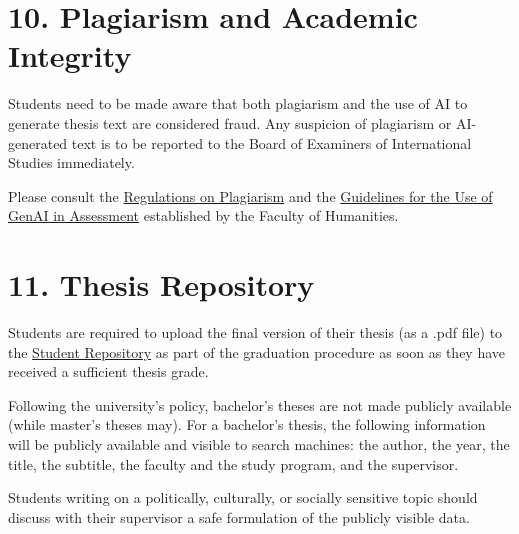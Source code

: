 \documentclass[11pt,a4paper]{article}
\begin{document}
\section{10. Plagiarism and Academic Integrity}

Students need to be made aware that both plagiarism and the use of AI to generate thesis text are considered fraud. Any suspicion of plagiarism or AI-generated text is to be reported to the Board of Examiners of International Studies immediately.

Please consult the \href{https://www.organisatiegids.universiteitleiden.nl/en/regulations/general/plagiarism}{Regulations on Plagiarism} and the \href{https://www.organisatiegids.universiteitleiden.nl/en/regulations/humanities/guidelines-for-the-use-of-genai-in-assessment}{Guidelines for the Use of GenAI in Assessment} established by the Faculty of Humanities.

\section{11. Thesis Repository}

Students are required to upload the final version of their thesis (as a .pdf file) to the \href{https://studenttheses.universiteitleiden.nl/}{Student Repository} as part of the graduation procedure as soon as they have received a sufficient thesis grade.

Following the university's policy, bachelor's theses are not made publicly available (while master's theses may). For a bachelor's thesis, the following information will be publicly available and visible to search machines: the author, the year, the title, the subtitle, the faculty and the study program, and the supervisor.

Students writing on a politically, culturally, or socially sensitive topic should discuss with their supervisor a safe formulation of the publicly visible data.
\end{document}
